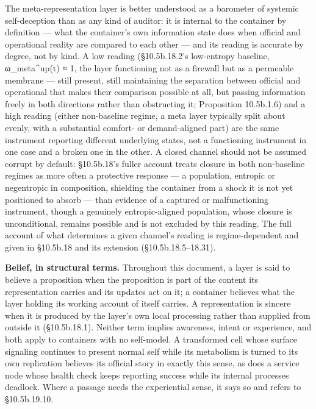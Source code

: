 \documentclass[
]{article}
\begin{document}
The meta-representation layer is better understood as a barometer of
systemic self-deception than as any kind of auditor: it is internal to
the container by definition --- what the container's own information
state does when official and operational reality are compared to each
other --- and its reading is accurate by degree, not by kind. A low
reading (§10.5b.18.2's low-entropy baseline, ω\_meta\^{}up(t) ≈ 1, the
layer functioning not as a firewall but as a permeable membrane ---
still present, still maintaining the separation between official and
operational that makes their comparison possible at all, but passing
information freely in both directions rather than obstructing it;
Proposition 10.5b.1.6) and a high reading (either non-baseline regime, a
meta layer typically split about evenly, with a substantial comfort- or
demand-aligned part) are the same instrument reporting different
underlying states, not a functioning instrument in one case and a broken
one in the other. A closed channel should not be assumed corrupt by
default: §10.5b.18's fuller account treats closure in both non-baseline
regimes as more often a protective response --- a population, entropic
or negentropic in composition, shielding the container from a shock it
is not yet positioned to absorb --- than evidence of a captured or
malfunctioning instrument, though a genuinely entropic-aligned
population, whose closure is unconditional, remains possible and is not
excluded by this reading. The full account of what determines a given
channel's reading is regime-dependent and given in §10.5b.18 and its
extension (§10.5b.18.5--18.31).

\textbf{Belief, in structural terms.} Throughout this document, a layer
is said to believe a proposition when the proposition is part of the
content its representation carries and its updates act on it; a
container believes what the layer holding its working account of itself
carries. A representation is sincere when it is produced by the layer's
own local processing rather than supplied from outside it (§10.5b.18.1).
Neither term implies awareness, intent or experience, and both apply to
containers with no self-model. A transformed cell whose surface
signaling continues to present normal self while its metabolism is
turned to its own replication believes its official story in exactly
this sense, as does a service node whose health check keeps reporting
success while its internal processes deadlock. Where a passage needs the
experiential sense, it says so and refers to §10.5b.19.10.
\end{document}
